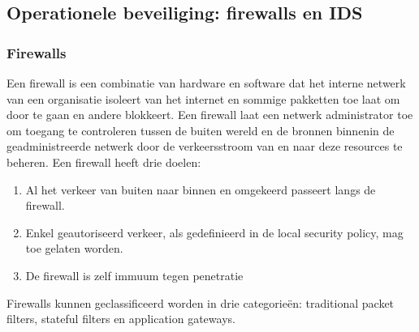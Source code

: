 \subsection{Operationele beveiliging: firewalls en IDS}

\subsubsection{Firewalls}

Een firewall is een combinatie van hardware en software dat het interne netwerk van een organisatie isoleert van het internet en sommige pakketten toe laat om door te gaan en andere blokkeert. Een firewall laat een netwerk administrator toe om toegang te controleren tussen de buiten wereld en de bronnen binnenin de geadministreerde netwerk door de verkeersstroom van en naar deze resources te beheren. Een firewall heeft drie doelen:
\begin{enumerate}
\item Al het verkeer van buiten naar binnen en omgekeerd passeert langs de firewall.
\item Enkel geautoriseerd verkeer, als gedefinieerd in de local security policy, mag toe gelaten worden.
\item De firewall is zelf immuum tegen penetratie
\end{enumerate}
Firewalls kunnen geclassificeerd worden in drie categorieën: traditional packet filters, stateful filters en application gateways.

\clearpage


